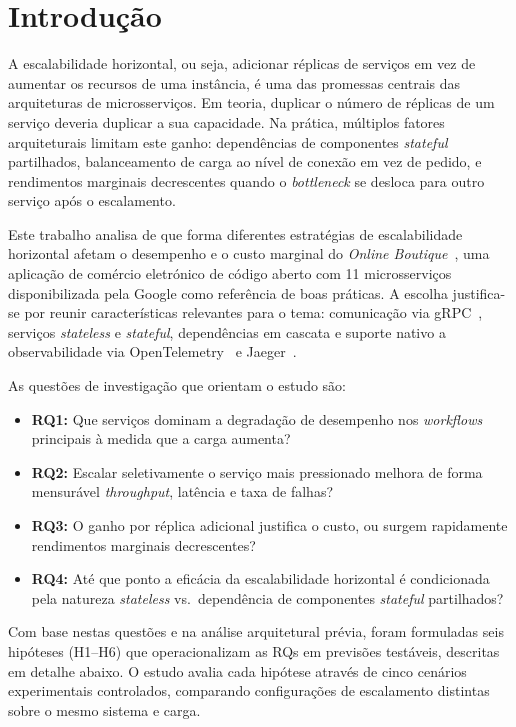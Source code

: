 \documentclass[manuscript,screen,review]{acmart}
\begin{document}
\section{Introdução}

A escalabilidade horizontal, ou seja, adicionar réplicas de serviços em vez de aumentar os recursos de uma instância, é uma das promessas centrais das arquiteturas de microsserviços. Em teoria, duplicar o número de réplicas de um serviço deveria duplicar a sua capacidade. Na prática, múltiplos fatores arquiteturais limitam este ganho: dependências de componentes \textit{stateful} partilhados, balanceamento de carga ao nível de conexão em vez de pedido, e rendimentos marginais decrescentes quando o \textit{bottleneck} se desloca para outro serviço após o escalamento.

Este trabalho analisa de que forma diferentes estratégias de escalabilidade horizontal afetam o desempenho e o custo marginal do \textit{Online Boutique}~\cite{onlineboutique}, uma aplicação de comércio eletrónico de código aberto com 11 microsserviços disponibilizada pela Google como referência de boas práticas. A escolha justifica-se por reunir características relevantes para o tema: comunicação via gRPC~\cite{grpc}, serviços \textit{stateless} e \textit{stateful}, dependências em cascata e suporte nativo a observabilidade via OpenTelemetry~\cite{otel} e Jaeger~\cite{jaeger}.

As questões de investigação que orientam o estudo são:
\begin{itemize}
  \item \textbf{RQ1:} Que serviços dominam a degradação de desempenho nos \textit{workflows} principais à medida que a carga aumenta?
  \item \textbf{RQ2:} Escalar seletivamente o serviço mais pressionado melhora de forma mensurável \textit{throughput}, latência e taxa de falhas?
  \item \textbf{RQ3:} O ganho por réplica adicional justifica o custo, ou surgem rapidamente rendimentos marginais decrescentes?
  \item \textbf{RQ4:} Até que ponto a eficácia da escalabilidade horizontal é condicionada pela natureza \textit{stateless} vs.\ dependência de componentes \textit{stateful} partilhados?
\end{itemize}

Com base nestas questões e na análise arquitetural prévia, foram formuladas seis hipóteses (H1--H6) que operacionalizam as RQs em previsões testáveis, descritas em detalhe abaixo. O estudo avalia cada hipótese através de cinco cenários experimentais controlados, comparando configurações de escalamento distintas sobre o mesmo sistema e carga.
\end{document}
